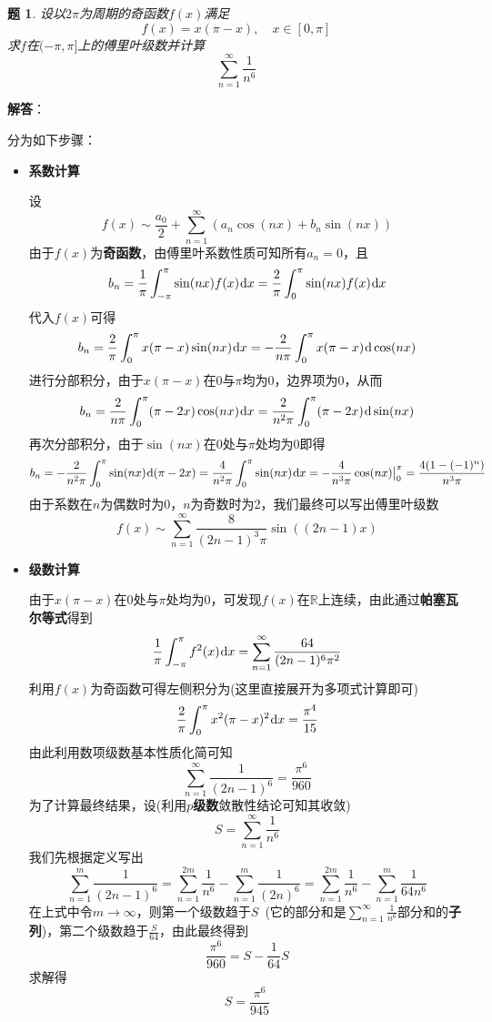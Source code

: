 \documentclass[a4paper,UTF8,fontset=windows,AutoFakeBold]{ctexart}
\newcommand*{\dr}{\hspace{0.07em}\mathrm{d}}
\newcommand*{\rb}{\mathbb{R}}
\newcommand*{\suminf}[1][n=1]{\sum_{#1}^\infty}
\theoremstyle{ex}
\newtheorem{exercise}{题}
\newcommand{\sol}[1]{{\vspace{5pt}\kaishu\noindent\textbf{解答}：\vspace{-3pt}
\begin{compactitem}
    \item[] #1
\end{compactitem}
}}
\begin{document}
\begin{framed}
\begin{exercise}\label{fourier n6}
    设以$2\pi$为周期的奇函数$f(x)$满足
    $$f(x)=x(\pi-x),\quad x\in[0,\pi]$$
    求$f$在$(-\pi,\pi]$上的傅里叶级数并计算
    $$\suminf\frac{1}{n^6}$$
\end{exercise}
\sol{
    分为如下步骤：
    \begin{itemize}
        \item \textbf{系数计算}
        
        设
        $$f(x)\sim\frac{a_0}{2}+\suminf(a_n\cos(nx)+b_n\sin(nx))$$
        由于$f(x)$为\textbf{奇函数}，由傅里叶系数性质可知所有$a_n=0$，且
        $$b_n=\frac{1}{\pi}\int_{-\pi}^\pi\sin(nx)f(x)\dr x=\frac{2}{\pi}\int_0^\pi\sin(nx)f(x)\dr x$$
        代入$f(x)$可得
        $$b_n=\frac{2}{\pi}\int_0^\pi x(\pi-x)\sin(nx)\dr x=-\frac{2}{n\pi}\int_0^\pi x(\pi-x)\dr\cos(nx)$$
        进行分部积分，由于$x(\pi-x)$在0与$\pi$均为0，边界项为0，从而
        $$b_n=\frac{2}{n\pi}\int_0^\pi(\pi-2x)\cos(nx)\dr x=\frac{2}{n^2\pi}\int_0^\pi(\pi-2x)\dr\sin(nx)$$
        再次分部积分，由于$\sin(nx)$在0处与$\pi$处均为0即得
        $$b_n=-\frac{2}{n^2\pi}\int_0^\pi\sin(nx)\dr(\pi-2x)=\frac{4}{n^2\pi}\int_0^\pi\sin(nx)\dr x=-\frac{4}{n^3\pi}\cos(nx)\big|^\pi_0=\frac{4(1-(-1)^n)}{n^3\pi}$$
        由于系数在$n$为偶数时为0，$n$为奇数时为2，我们最终可以写出傅里叶级数
        $$f(x)\sim\suminf\frac{8}{(2n-1)^3\pi}\sin((2n-1)x)$$
        
        \item \textbf{级数计算}
        
        由于$x(\pi-x)$在0处与$\pi$处均为0，可发现$f(x)$在$\rb$上连续，由此通过\textbf{帕塞瓦尔等式}得到
        $$\frac{1}{\pi}\int_{-\pi}^\pi f^2(x)\dr x=\suminf\frac{64}{(2n-1)^6\pi^2}$$
        利用$f(x)$为奇函数可得左侧积分为(这里直接展开为多项式计算即可)
        $$\frac{2}{\pi}\int_0^\pi x^2(\pi-x)^2\dr x=\frac{\pi^4}{15}$$
        由此利用数项级数基本性质化简可知
        $$\suminf\frac{1}{(2n-1)^6}=\frac{\pi^6}{960}$$
        为了计算最终结果，设(利用\textbf{$p$级数}敛散性结论可知其收敛)
        $$S=\suminf\frac{1}{n^6}$$
        我们先根据定义写出
        $$\sum_{n=1}^m\frac{1}{(2n-1)^6}=\sum_{n=1}^{2m}\frac{1}{n^6}-\sum_{n=1}^m\frac{1}{(2n)^6}=\sum_{n=1}^{2m}\frac{1}{n^6}-\sum_{n=1}^m\frac{1}{64n^6}$$
        在上式中令$m\to\infty$，则第一个级数趋于$S$\ (它的部分和是$\suminf\frac{1}{n^6}$部分和的\textbf{子列})，第二个级数趋于$\frac{S}{64}$，由此最终得到
        $$\frac{\pi^6}{960}=S-\frac{1}{64}S$$
        求解得
        $$S=\frac{\pi^6}{945}$$
    \end{itemize}
}
\end{framed}
\end{document}
